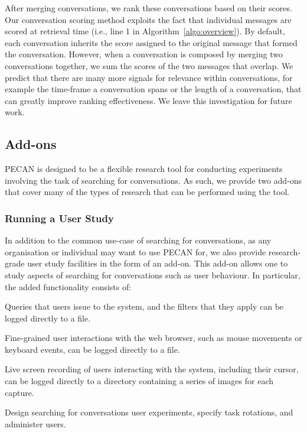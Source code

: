 After merging conversations, we rank these conversations based on their scores. Our conversation scoring method exploits the fact that individual messages are scored at retrieval time (i.e., line 1 in Algorithm~\ref{algo:overview}). By default, each conversation inherits the score assigned to the original message that formed the conversation. However, when a conversation is composed by merging two conversations together, we sum the scores of the two messages that overlap. We predict that there are many more signals for relevance within conversations, for example the time-frame a conversation spans or the length of a conversation, that can greatly improve ranking effectiveness. We leave this investigation for future work.


\subsection{Add-ons}

PECAN is designed to be a flexible research tool for conducting experiments involving the task of searching for conversations. As such, we provide two add-ons that cover many of the types of research that can be performed using the tool.

\subsubsection{Running a User Study}

In addition to the common use-case of searching for conversations, as any organisation or individual may want to use PECAN for, we also provide research-grade user study facilities in the form of an add-on. This add-on allows one to study aspects of searching for conversations such as user behaviour. In particular, the added functionality consists of:
\begin{description}[noitemsep, leftmargin=8pt]
\item[Query Logging.] Queries that users issue to the system, and the filters that they apply can be logged directly to a file. 
\item[Interaction Logging.] Fine-grained user interactions with the web browser, such as mouse movements or keyboard events, can be logged directly to a file.
\item[Screen Recording.] Live screen recording of users interacting with the system, including their cursor, can be logged directly to a directory containing a series of images for each capture.
\item[Administration.] Design searching for conversations user experiments, specify task rotations, and administer users.
\end{description}

